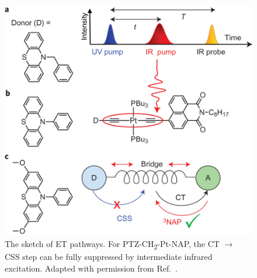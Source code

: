 \begin{figure}[!h]
\includegraphics[width=0.71\columnwidth]{Chapters/chap4/Images/scheme.jpg}
\caption{The sketch of ET pathways. For PTZ-CH\textsubscript{2}-Pt-NAP, the CT $\rightarrow$ CSS step can be fully suppressed by intermediate infrared excitation. Adapted with permission from Ref.~\cite{delor2015mechanism}.\label{ETscheme}}
\end{figure}

